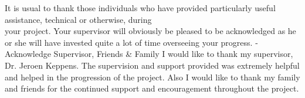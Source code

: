 It is usual to thank those individuals who have provided particularly useful assistance, technical or otherwise, during\\ your project. Your supervisor will obviously be pleased to be acknowledged as he or she will have invested quite a lot of time overseeing your progress.
-Acknowledge Supervisor, Friends \& Family
I would like to thank my supervisor, Dr. Jeroen Keppens. The supervision and support provided was extremely helpful and helped in the progression of the project.  Also I would like to thank my family and friends for the continued support and encouragement throughout the project.